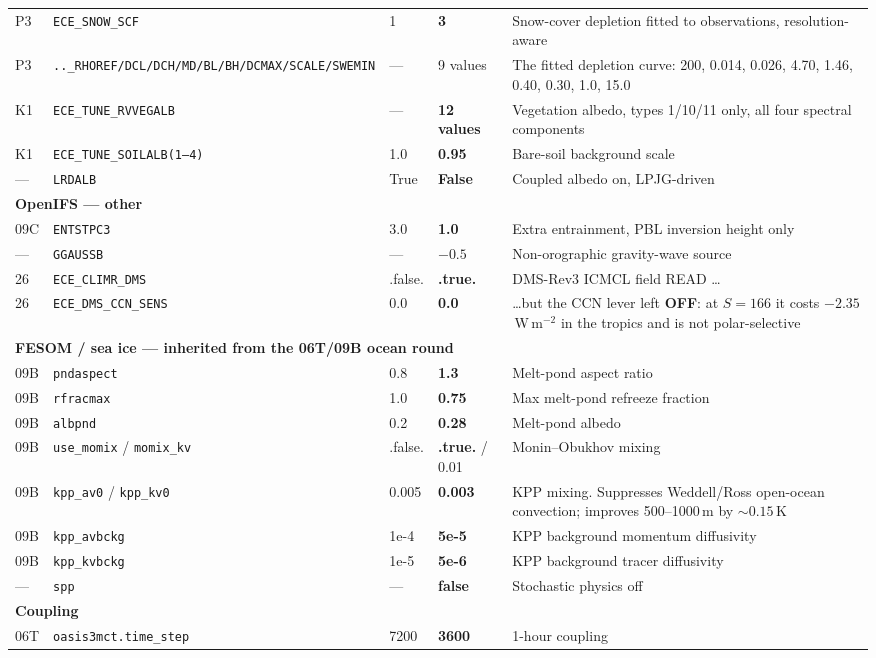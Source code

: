 \documentclass[9pt,a4paper]{article}
\newcommand{\pk}{\textcolor{black!55}}
\begin{document}
\begin{center}
\begin{longtable}{p{} p{} p{} p{} p{}}
P3 & \texttt{ECE\_SNOW\_SCF} & 1 & \textbf{3} & Snow-cover depletion fitted to observations, resolution-aware \\
P3 & \pk{\texttt{..\_RHOREF/DCL/DCH/MD/BL/BH/DCMAX/SCALE/SWEMIN}} & --- & \pk{9 values} & \pk{The fitted depletion curve: 200, 0.014, 0.026, 4.70, 1.46, 0.40, 0.30, 1.0, 15.0} \\
K1 & \texttt{ECE\_TUNE\_RVVEGALB} & --- & \textbf{12 values} & Vegetation albedo, types 1/10/11 only, all four spectral components \\
K1 & \texttt{ECE\_TUNE\_SOILALB(1--4)} & 1.0 & \textbf{0.95} & Bare-soil background scale \\
--- & \texttt{LRDALB} & True & \textbf{False} & Coupled albedo on, LPJG-driven \\
\midrule
\multicolumn{5}{l}{\textbf{OpenIFS --- other}}\\
09C & \texttt{ENTSTPC3} & 3.0 & \textbf{1.0} & Extra entrainment, PBL inversion height only \\
--- & \texttt{GGAUSSB} & --- & \textbf{$-0.5$} & Non-orographic gravity-wave source \\
26 & \texttt{ECE\_CLIMR\_DMS} & .false. & \textbf{.true.} & DMS-Rev3 ICMCL field READ \ldots \\
26 & \texttt{ECE\_DMS\_CCN\_SENS} & 0.0 & \textbf{0.0} & \ldots but the CCN lever left \textbf{OFF}: at $S{=}166$ it costs $-2.35$\,W\,m$^{-2}$ in the tropics and is not polar-selective \\
\midrule
\multicolumn{5}{l}{\textbf{FESOM / sea ice --- inherited from the 06T/09B ocean round}}\\
09B & \texttt{pndaspect} & 0.8 & \textbf{1.3} & Melt-pond aspect ratio \\
09B & \texttt{rfracmax} & 1.0 & \textbf{0.75} & Max melt-pond refreeze fraction \\
09B & \texttt{albpnd} & 0.2 & \textbf{0.28} & Melt-pond albedo \\
09B & \texttt{use\_momix} / \texttt{momix\_kv} & .false. & \textbf{.true.} / 0.01 & Monin--Obukhov mixing \\
09B & \texttt{kpp\_av0} / \texttt{kpp\_kv0} & 0.005 & \textbf{0.003} & KPP mixing. Suppresses Weddell/Ross open-ocean convection; improves 500--1000\,m by ${\sim}0.15$\,K \\
09B & \texttt{kpp\_avbckg} & 1e-4 & \textbf{5e-5} & KPP background momentum diffusivity \\
09B & \texttt{kpp\_kvbckg} & 1e-5 & \textbf{5e-6} & KPP background tracer diffusivity \\
--- & \texttt{spp} & --- & \textbf{false} & Stochastic physics off \\
\midrule
\multicolumn{5}{l}{\textbf{Coupling}}\\
06T & \texttt{oasis3mct.time\_step} & 7200 & \textbf{3600} & 1-hour coupling \\
\bottomrule
\end{longtable}
\end{center}
\end{document}
